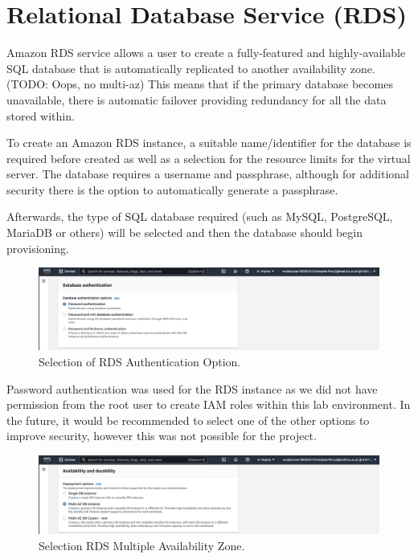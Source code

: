 \chapter{Relational Database Service (RDS)}\label{ch:relational-database-service}
Amazon RDS service allows a user to create a fully-featured and highly-available SQL database that is automatically
replicated to another availability zone. (TODO: Oops, no multi-az) This means that if the primary database becomes
unavailable, there is automatic failover providing redundancy for all the data stored within.

To create an Amazon RDS instance, a suitable name/identifier for the database is required before created as well as a
selection for the resource limits for the virtual server.
The database requires a username and passphrase, although for additional security there is the option to automatically
generate a passphrase.

Afterwards, the type of SQL database required (such as MySQL, PostgreSQL, MariaDB or others) will be selected and then
the database should begin provisioning.

\begin{figure}[!htbp]
    \centering
    \includegraphics[width=\textwidth]{resources/rds/rds-authentication.png}
    \caption{Selection of RDS Authentication Option.}
    \label{fig:rds-auth}
\end{figure}

Password authentication was used for the RDS instance as we did not have permission from the root user to create IAM
roles within this lab environment.
In the future, it would be recommended to select one of the other options to improve security, however this was not
possible for the project.

\begin{figure}[!htbp]
    \centering
    \includegraphics[width=\textwidth]{resources/rds/rds-availability-durability}
    \caption{Selection RDS Multiple Availability Zone.}
    \label{fig:rds-avail}
\end{figure}

